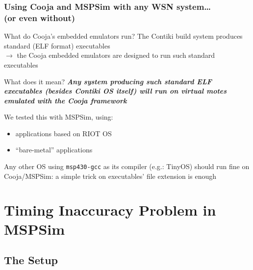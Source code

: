 \documentclass[10pt,c]{beamer}
\renewcommand{\emph}[1]{\textbf{\textit{#1}}}
\begin{document}
\begin{frame}
\frametitle{Using Cooja and MSPSim with any WSN system\ldots \\
            (or even without)}
\begin{block}{What do Cooja's embedded emulators run?}
\small
The Contiki build system produces standard (ELF format) executables \\
$\rightarrow$ the Cooja embedded emulators are designed to run such
standard executables
\end{block}
\begin{exampleblock}{What does it mean?}
\small
\emph{Any system producing such standard ELF executables (besides Contiki
OS itself) will run on virtual motes emulated with the Cooja framework}

We tested this with MSPSim, using:
\begin{itemize}
\item applications based on RIOT OS
\item ``bare-metal'' applications
\end{itemize}

Any other OS using \texttt{msp430-gcc} as its compiler (e.g.: TinyOS)
should run fine on Cooja/MSPSim: a simple trick on executables' file
extension is enough
\end{exampleblock}
\end{frame}


\section{Timing Inaccuracy Problem in MSPSim}

\subsection{The Setup}
\end{document}
